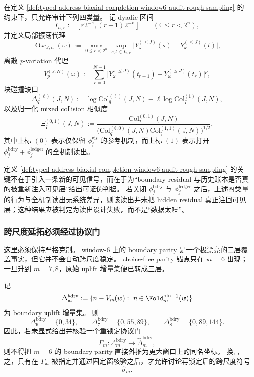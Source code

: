 在定义 \ref{def:typed-address-biaxial-completion-window6-audit-rough-sampling} 的约束下，只允许审计下列四类量。
记 dyadic 区间
\[
I_{n,r}:=[r2^{-n},(r+1)2^{-n}]
\qquad (0\le r<2^n),
\]
并定义局部振荡代理
\[
\operatorname{Osc}_{J,n}(\omega)
:=
\max_{0\le r<2^n}
\sup_{s,t\in I_{n,r}}
\bigl|Y_\omega^{(\le J)}(s)-Y_\omega^{(\le J)}(t)\bigr|,
\]
离散 \(p\)-variation 代理
\[
V_p^{(J,N)}(\omega)
:=
\sum_{r=0}^{N-1}
\bigl|Y_\omega^{(\le J)}(t_{r+1})-Y_\omega^{(\le J)}(t_r)\bigr|^p,
\]
块碰撞缺口
\[
\Delta_q^{(\ell)}(J,N)
:=
\log \mathrm{Col}_q^{(\ell)}(J,N)
-\ell \log \mathrm{Col}_q^{(1)}(J,N),
\]
以及归一化 mixed collision 相似度
\[
\Xi_q^{(0,1)}(J,N)
:=
\frac{\mathrm{Col}_q^{(0,1)}(J,N)}
{\bigl(\mathrm{Col}_q^{(0,0)}(J,N)\mathrm{Col}_q^{(1,1)}(J,N)\bigr)^{1/2}},
\]
其中上标 \((0)\) 表示仅保留 \(\phi_j^{\mathrm{vis}}\) 的参考机制，而上标 \((1)\) 表示打开 \(\phi_j^{\mathrm{bdry}}+\phi_j^{\mathrm{ledger}}\) 的全机制读出。

定义 \ref{def:typed-address-biaxial-completion-window6-audit-rough-sampling} 的关键不在于引入一条新的可见信号，而在于为“boundary residual 与历史账本是否真的被重新注入可见层”给出可证伪判据。
若关闭 \(\phi_j^{\mathrm{bdry}}\) 与 \(\phi_j^{\mathrm{ledger}}\) 之后，上述四类量的行为与全机制读出无系统差异，则该读出并未把 hidden residual 真正注回可见层；这种结果应被判定为读出设计失败，而不是“数据太噪”。

\subsubsection{跨尺度延拓必须经过协议门}\label{subsubsec:typed-address-biaxial-completion-window6-numerical-audit-crossscale-gate}
这里必须保持严格克制。
window-\(6\) 上的 boundary parity 是一个极漂亮的二层覆盖事实，但它并不会自动跨尺度稳定。
choice-free parity 锚点只在 \(m=6\) 出现；一旦升到 \(m=7,8\)，原始 uplift 增量集便已转成三层。

\begin{proposition}\label{prop:typed-address-biaxial-completion-window6-audit-crossscale-gate}
记
\[
\Delta_m^{\mathrm{bdry}}
:=
\{n-V_m(w):\ n\in \Fold_m^{\mathrm{bin}}{}^{-1}(w)\}
\]
为 boundary uplift 增量集。
则
\[
\Delta_6^{\mathrm{bdry}}=\{0,34\},
\qquad
\Delta_7^{\mathrm{bdry}}=\{0,55,89\},
\qquad
\Delta_8^{\mathrm{bdry}}=\{0,89,144\}.
\]
因此，若未显式给出并核验一个重锁定协议门
\[
\Gamma_m:\Delta_m^{\mathrm{bdry}}\longrightarrow \widehat{\Delta}_m^{\mathrm{bdry}},
\]
则不得把 \(m=6\) 的 boundary parity 直接外推为更大窗口上的同名坐标。
换言之，只有在 \(\Gamma_m\) 被指定并通过固定窗核验之后，才允许讨论再锁定后的跨尺度符号
\[
\widehat{\sigma}_m.
\]
\end{proposition}


